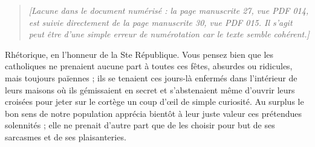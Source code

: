 \begin{quote}
\textit{[Lacune dans le document numérisé : la page manuscrite 27, vue PDF 014, est suivie directement de la page manuscrite 30, vue PDF 015. Il s'agit peut être d'une simple erreur de numérotation car le texte semble cohérent.]}
\end{quote}

Rhétorique, en l'honneur de la Ste République. Vous pensez bien que les catholiques ne prenaient aucune part à toutes ces fêtes, absurdes ou ridicules, mais toujours païennes ; ils se tenaient ces jours-là enfermés dans l'intérieur de leurs maisons où ils gémissaient en secret et s'abstenaient même d'ouvrir leurs croisées pour jeter sur le cortège un coup d'œil de simple curiosité. Au surplus le bon sens de notre population apprécia bientôt à leur juste valeur ces prétendues solennités ; elle ne prenait d'autre part que de les choisir pour but de ses sarcasmes et de ses plaisanteries.

